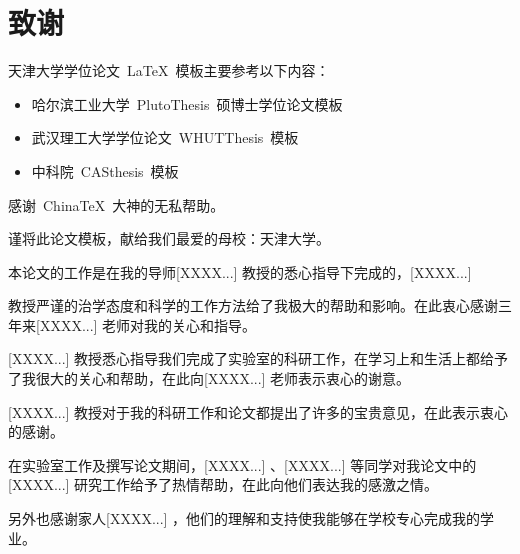 
\chapter*{致\qquad 谢}

天津大学学位论文~\LaTeX~模板主要参考以下内容：
\begin{itemize}
  \item 哈尔滨工业大学~PlutoThesis~硕博士学位论文模板
  \item 武汉理工大学学位论文~WHUTThesis~模板
  \item 中科院~CASthesis~模板
\end{itemize}

感谢~ChinaTeX~大神的无私帮助。

谨将此论文模板，献给我们最爱的母校：天津大学。

\vspace*{1cm}
本论文的工作是在我的导师[XXXX...] 教授的悉心指导下完成的，[XXXX...]

教授严谨的治学态度和科学的工作方法给了我极大的帮助和影响。在此衷心感谢三年来[XXXX...] 老师对我的关心和指导。

[XXXX...] 教授悉心指导我们完成了实验室的科研工作，在学习上和生活上都给予了我很大的关心和帮助，在此向[XXXX...] 老师表示衷心的谢意。

[XXXX...] 教授对于我的科研工作和论文都提出了许多的宝贵意见，在此表示衷心的感谢。

在实验室工作及撰写论文期间，[XXXX...] 、[XXXX...] 等同学对我论文中的[XXXX...] 研究工作给予了热情帮助，在此向他们表达我的感激之情。

另外也感谢家人[XXXX...] ，他们的理解和支持使我能够在学校专心完成我的学业。



